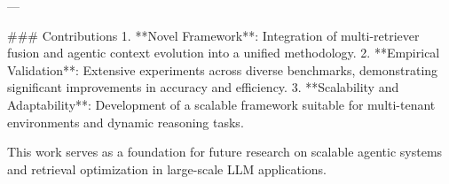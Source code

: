---

### Contributions  
1. **Novel Framework**: Integration of multi-retriever fusion and agentic context evolution into a unified methodology.  
2. **Empirical Validation**: Extensive experiments across diverse benchmarks, demonstrating significant improvements in accuracy and efficiency.  
3. **Scalability and Adaptability**: Development of a scalable framework suitable for multi-tenant environments and dynamic reasoning tasks.  

This work serves as a foundation for future research on scalable agentic systems and retrieval optimization in large-scale LLM applications.